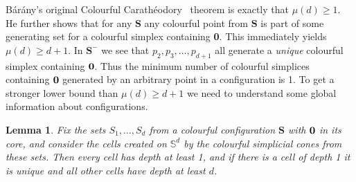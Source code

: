 \documentclass[epsbox,12pt,reqno]{amsart}
\newtheorem{lemma}[theorem]{Lemma}
\theoremstyle{definition}
\theoremstyle{remark}
\def\S{\mathbf{S}}
\def\bara{B\'ar\'any}
\def\cara{Carath\'eodory}
\def\Sph{\mathbb{S}}
\def\zero{{\bf 0}}
\begin{document}
\bara's original Colourful \cara~ theorem is exactly
that $\mu(d) \ge 1$.  He further shows that 
for any $\S$ any colourful point from $\S$ is part of some
generating set for a colourful simplex containing \zero.  This
immediately yields $\mu(d) \ge d+1$.  In $\S^\minus$ 
we see that $p_2, p_3, \ldots, p_{d+1}$ all generate a 
{\it unique} colourful simplex containing $\zero$.  Thus
the minimum number of colourful simplices containing 
$\zero$ generated by an arbitrary point in a configuration is 1.
To get a stronger lower bound than $\mu(d) \ge d+1$ we need to 
understand some global information about configurations.

\begin{lemma}\label{le:depthd}
Fix the sets $S_1, \ldots, S_d$ from a colourful configuration $\S$
with $\zero$ in its core, and consider the cells created
on $\Sph^d$ by the colourful simplicial cones from these sets.
Then every cell has depth at least 1, and if there is a cell of
depth 1 it is unique and all other cells have depth at least $d$.
\end{lemma}
\end{document}
